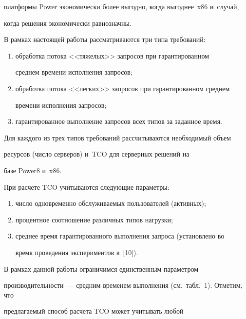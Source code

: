 платформы Power экономически более выгодно, когда выгоднее~x86 и~случай, 

когда решения экономически равнозначны.

  

  В рамках настоящей работы рассматриваются три типа требований:

  \begin{enumerate}[(1)]

\item обработка потока <<тяжелых>> запросов при гарантированном 

среднем времени исполнения запросов;

\item обработка потока <<легких>> запросов при гарантированном среднем 

времени исполнения запросов;

\item гарантированное выполнение запросов всех типов за заданное время.

\end{enumerate}

  

  Для каждого из трех типов требований рассчитываются необходимый объем 

ресурсов (число серверов) и~TCO для серверных решений на 

базе Power8 и~x86.

  

  При расчете TCO учитываются следующие па\-ра\-метры:  

\begin{enumerate}[(1)]

  \item число одновременно обслуживаемых пользователей (активных);

\item процентное соотношение различных типов нагрузки;

\item среднее время гарантированного выполнения запроса (установлено во 

время проведения экспериментов в~[10]).

\end{enumerate}

  

  В рамках данной работы ограничимся единственным параметром 

производительности~--- средним временем выполнения (см.\ табл.~1). Отметим, что 

пред\-ла\-га\-емый способ расчета TCO может учитывать любой  

